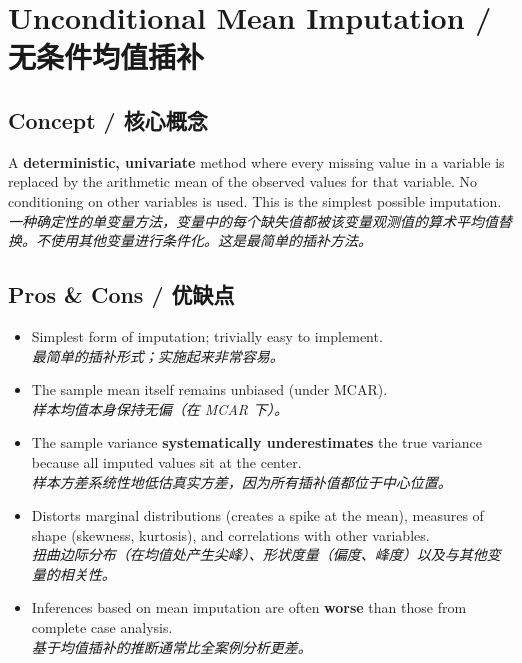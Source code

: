 \documentclass[9pt, a4paper]{article}
\begin{document}
\section{Unconditional Mean Imputation / 无条件均值插补}

\subsection{Concept / 核心概念}
\begin{tcolorbox}[defbox]
    A \textbf{deterministic, univariate} method where every missing value in a variable is replaced by the arithmetic mean of the observed values for that variable. No conditioning on other variables is used. This is the simplest possible imputation.\\
    \textit{一种确定性的单变量方法，变量中的每个缺失值都被该变量观测值的算术平均值替换。不使用其他变量进行条件化。这是最简单的插补方法。}
\end{tcolorbox}

\subsection{Pros \& Cons / 优缺点}
\begin{tcolorbox}[prosbox]
    \begin{itemize}
        \item [\ding{51}] Simplest form of imputation; trivially easy to implement.\\
        \textit{最简单的插补形式；实施起来非常容易。}
        \item [\ding{51}] The sample mean itself remains unbiased (under MCAR).\\
        \textit{样本均值本身保持无偏（在 MCAR 下）。}
    \end{itemize}
\end{tcolorbox}
\begin{tcolorbox}[consbox]
    \begin{itemize}
        \item [\ding{55}] The sample variance \textbf{systematically underestimates} the true variance because all imputed values sit at the center.\\
        \textit{样本方差系统性地低估真实方差，因为所有插补值都位于中心位置。}
        \item [\ding{55}] Distorts marginal distributions (creates a spike at the mean), measures of shape (skewness, kurtosis), and correlations with other variables.\\
        \textit{扭曲边际分布（在均值处产生尖峰）、形状度量（偏度、峰度）以及与其他变量的相关性。}
        \item [\ding{55}] Inferences based on mean imputation are often \textbf{worse} than those from complete case analysis.\\
        \textit{基于均值插补的推断通常比全案例分析更差。}
    \end{itemize}
\end{tcolorbox}
\end{document}
